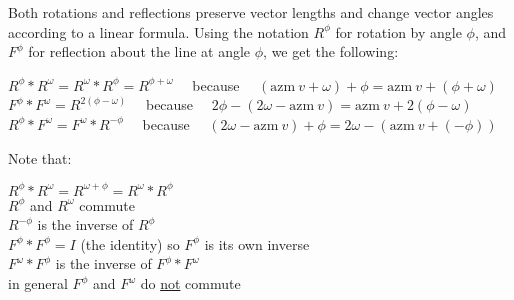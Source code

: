 \documentclass[12pt]{article}
\begin{document}
Both rotations and reflections preserve vector lengths
and change vector angles according to a linear formula.
Using the notation $R^\phi$ for rotation by angle $\phi$,
and $F^\phi$ for reflection about the line at angle $\phi$,
we get the following:
\begin{center}
$R^\phi*R^\omega=R^\omega*R^\phi=R^{\phi+\omega}$
~~because~~
    $(\mathrm{azm}~v + \omega) + \phi = \mathrm{azm}~v + (\phi+\omega)$ \\
$F^\phi*F^\omega = R^{2(\phi-\omega)}$
~~because~~
    $2\phi - (2\omega - \mathrm{azm}~v) = \mathrm{azm}~v + 2(\phi-\omega)$ \\
$R^\phi*F^\omega = F^\omega*R^{-\phi}$
~~because~~
    $(2\omega - \mathrm{azm}~v) + \phi =
      2\omega - (\mathrm{azm}~v + (-\phi))$
\end{center}
Note that:
\begin{center}
$R^\phi*R^\omega=R^{\omega+\phi}=R^\omega*R^\phi$ \\
$R^\phi$ and $R^\omega$ commute \\
$R^{-\phi}$ is the inverse of $R^\phi$ \\
$F^\phi*F^\phi= I$ (the identity) so  $F^\phi$ is its own inverse \\
$F^\omega*F^\phi$ is the inverse of $F^\phi*F^\omega$ \\
in general $F^\phi$ and $F^\omega$ do \underline{not} commute\\
\end{center}

\bigskip
\end{document}
